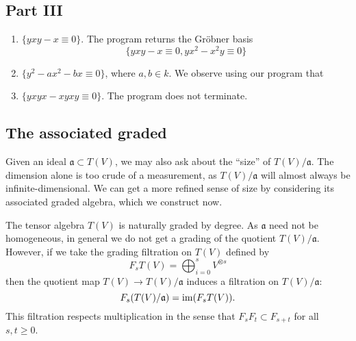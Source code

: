 \subsection*{Part III}

\begin{enumerate}
	\item $\{yxy-x\equiv 0\}$. The program returns the Gr\"obner basis
	\begin{equation*}
		\{yxy-x\equiv 0,yx^2-x^2y\equiv 0\}
	\end{equation*}
	\item $\{y^2-ax^2-bx\equiv 0\}$, where $a,b\in k$. We observe using our program that
	\item $\{yxyx-xyxy\equiv 0\}$. The program does not terminate.
\end{enumerate}

\subsection{The associated graded}\label{sec:assoc-graded}
Given an ideal $\mathfrak{a} \subset T(V)$, we may also ask about the ``size'' of $T(V)/\mathfrak{a}$. The dimension alone is too crude of a measurement, as $T(V)/\mathfrak{a}$ will almost always be infinite-dimensional. We can get a more refined sense of size by considering its associated graded algebra, which we construct now.

The tensor algebra $T(V)$ is naturally graded by degree. As $\mathfrak{a}$ need not be homogeneous, in general we do not get a grading of the quotient $T(V)/\mathfrak{a}$. However, if we take the grading filtration on $T(V)$ defined by
\[
	F_s T(V) = \bigoplus_{i=0}^s V^{\otimes s}
\]
then the quotient map $T(V) \to T(V)/\mathfrak{a}$ induces a filtration on $T(V)/\mathfrak{a}$:
\[
	F_s(T(V)/\mathfrak{a}) = \operatorname{im} (F_s T(V)).
\]
This filtration respects multiplication in the sense that $F_s F_t \subset F_{s+t}$ for all $s,t \geq 0$.

